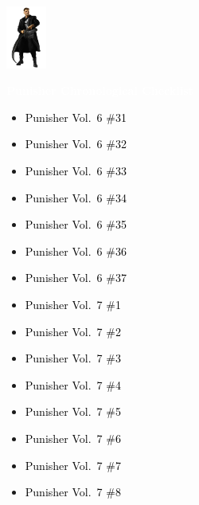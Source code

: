 \documentclass[12pt]{article}
\newcommand{\checkbox}{\raisebox{0.0ex}{\fbox{\rule{0ex}{1.5ex} \rule{1.5ex}{0ex}}}}
\begin{document}
\begin{center}
    \vspace*{2cm}
    \includegraphics[width=0.1\textwidth]{PUNISHER1.PNG}
    \vspace{0.3cm}

    {\Huge \textbf{\textcolor{white}{Punisher Chronological Checklist}}}
\end{center}

\vspace{0.3cm}
\noindent
\begin{tcolorbox}[
  colback=white!95!gray,
  colframe=black,
  width=\textwidth,
  arc=4mm,
  auto outer arc,
  boxrule=0.8pt,
  left=8pt,right=8pt,top=8pt,bottom=8pt
]
\begin{itemize}[left=0pt,label={\checkbox}]
    \item \textcolor{black}{Punisher Vol.\ 6 \#31}
    \item \textcolor{black}{Punisher Vol.\ 6 \#32}
    \item \textcolor{black}{Punisher Vol.\ 6 \#33}
    \item \textcolor{black}{Punisher Vol.\ 6 \#34}
    \item \textcolor{black}{Punisher Vol.\ 6 \#35}
    \item \textcolor{black}{Punisher Vol.\ 6 \#36}
    \item \textcolor{black}{Punisher Vol.\ 6 \#37}
    \item \textcolor{black}{Punisher Vol.\ 7 \#1}
    \item \textcolor{black}{Punisher Vol.\ 7 \#2}
    \item \textcolor{black}{Punisher Vol.\ 7 \#3}
    \item \textcolor{black}{Punisher Vol.\ 7 \#4}
    \item \textcolor{black}{Punisher Vol.\ 7 \#5}
    \item \textcolor{black}{Punisher Vol.\ 7 \#6}
    \item \textcolor{black}{Punisher Vol.\ 7 \#7}
    \item \textcolor{black}{Punisher Vol.\ 7 \#8}
\end{itemize}
\end{tcolorbox}
\end{document}
